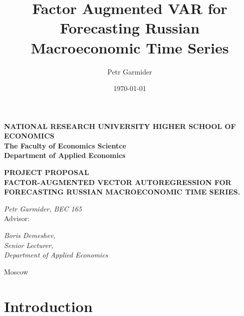 \documentclass[a4paper, 14pt]{article}
\title{Factor Augmented VAR for Forecasting Russian Macroeconomic Time Series}
\author{Petr Garmider}
\date{\today}
\begin{document}
	\newpage
	\thispagestyle{empty}
	\begin{center}
		
		\vspace{0.1ex}
		
		{\textbf{NATIONAL RESEARCH UNIVERSITY HIGHER SCHOOL OF ECONOMICS}}\\
		\vspace{1ex}
		{\textbf{The Faculty of Economics Scientce}}\\
		\vspace{1ex}
		{\textbf{
				Department of Applied Economics}}\\
		
	\end{center}
	\vspace{5ex}
	\begin{center}
		\vspace{3ex}
		{\textbf{PROJECT PROPOSAL}}\\
		\vspace{3ex}
		{
			\vspace{2ex} \textbf{FACTOR-AUGMENTED VECTOR AUTOREGRESSION FOR FORECASTING RUSSIAN MACROECONOMIC TIME SERIES.}}
	\end{center}
	\begin{flushright}
		\vspace{13ex}
		\noindent
		\textit{Petr Garmider, BEC 165}
		\\
		\vspace{5ex}
		Advisor:\\
		\vspace{2ex}
		
		\textit{Boris Demeshev, \\Senior Lecturer, \\Department of Applied Economics}\\
		
		
	\end{flushright}

	\vspace{64ex}
	
	\begin{center}
		\vspace{3ex}
		{Moscow}\\
		\vspace{1ex}{28 February 2020}
	\end{center}	
	
	\newpage
	
\section*{Introduction}
\end{document}
